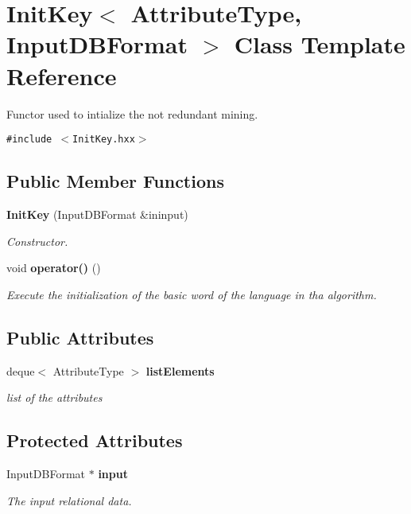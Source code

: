 \section{Init\-Key$<$ Attribute\-Type, Input\-DBFormat $>$ Class Template Reference}
\label{class_init_key}
Functor used to intialize the not redundant mining.  


{\tt \#include $<$Init\-Key.hxx$>$}

\subsection*{Public Member Functions}
\begin{CompactItemize}
\item 
{\bf Init\-Key} (Input\-DBFormat \&ininput)\label{class_init_key_98e5ce76e2211fa750dfdff4e61605d8}

\begin{CompactList}\small\item\em Constructor. \item\end{CompactList}\item 
void {\bf operator()} ()\label{class_init_key_0d4c102edccfdf37f747b02ed159e0c6}

\begin{CompactList}\small\item\em Execute the initialization of the basic word of the language in tha algorithm. \item\end{CompactList}\end{CompactItemize}
\subsection*{Public Attributes}
\begin{CompactItemize}
\item 
deque$<$ Attribute\-Type $>$ {\bf list\-Elements}\label{class_init_key_53242d2f0e4257b05f91e1b1f8849b4c}

\begin{CompactList}\small\item\em list of the attributes \item\end{CompactList}\end{CompactItemize}
\subsection*{Protected Attributes}
\begin{CompactItemize}
\item 
Input\-DBFormat $\ast$ {\bf input}\label{class_init_key_0c035f6bf918ef2654e40bf7a70f5a0a}

\begin{CompactList}\small\item\em The input relational data. \item\end{CompactList}\end{CompactItemize}


